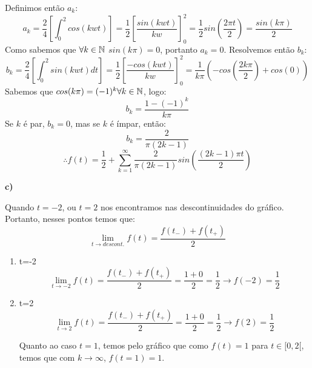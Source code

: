Definimos então $a_k$:
\begin{equation*}
    a_k = \frac{2}{4}\left[\int^2_0 cos(kwt)\right] = \frac{1}{2}\left[\frac{sin(kwt)}{kw}\right]^2_0 = \frac{1}{2}sin\left(\frac{2\pi t}{2}\right) = \frac{sin(k\pi)}{2} 
\end{equation*}
Como sabemos que $\forall k \in \mathbb{N}$ $sin(k\pi) = 0$, portanto $\boxed{a_k = 0}$. Resolvemos então $b_k$:
\begin{equation*}
    b_k = \frac{2}{4}\left[\int^2_0 sin(kwt)dt\right] = \frac{1}{2}\left[\frac{-cos(kwt)}{kw}\right]^2_0 = \frac{1}{k\pi}\left(-cos\left(\frac{2k\pi}{2}\right)+cos(0)\right)
\end{equation*}
Sabemos que $cos(k\pi)=(-1)^k\forall k \in \mathbb{N}$, logo:
\begin{equation*}
   b_k = \frac{1-(-1)^k}{k\pi}
\end{equation*}
Se $k$ é par, $b_k = 0$, mas se $k$ é ímpar, então:
\begin{equation*}
    \boxed{b_k = \frac{2}{\pi(2k-1)}}
\end{equation*}
\begin{equation*}
    \boxed{\therefore f(t) = \frac{1}{2} + \sum^\infty_{k=1} \frac{2}{\pi(2k-1)}sin\left(\frac{(2k-1)\pi t}{2}\right)} 
\end{equation*}

\textbf{c)}

Quando $t=-2$, ou $t=2$ nos encontramos nas descontinuidades do gráfico. Portanto, nesses pontos temos que:
\begin{equation*}
    \lim_{t\rightarrow{}descont.} f(t) = \frac{f(t_-) + f(t_+)}{2}
\end{equation*}
\begin{enumerate}[i]
    \item t=-2
    \begin{equation*}
        \lim_{t\rightarrow-2} f(t) = \frac{f(t_-) + f(t_+)}{2} = \frac{1+0}{2} = \frac{1}{2} \rightarrow f(-2) = \frac{1}{2}
    \end{equation*}
    \item t=2
    \begin{equation*}
        \lim_{t\rightarrow2} f(t) = \frac{f(t_-) + f(t_+)}{2} = \frac{1+0}{2} = \frac{1}{2} \rightarrow f(2) = \frac{1}{2}
    \end{equation*}

Quanto ao caso $t=1$, temos pelo gráfico que como $f(t) = 1 $ para $t \in [0,2[$, temos que com $k\rightarrow\infty$, $f(t=1)=1$.
\end{enumerate}

